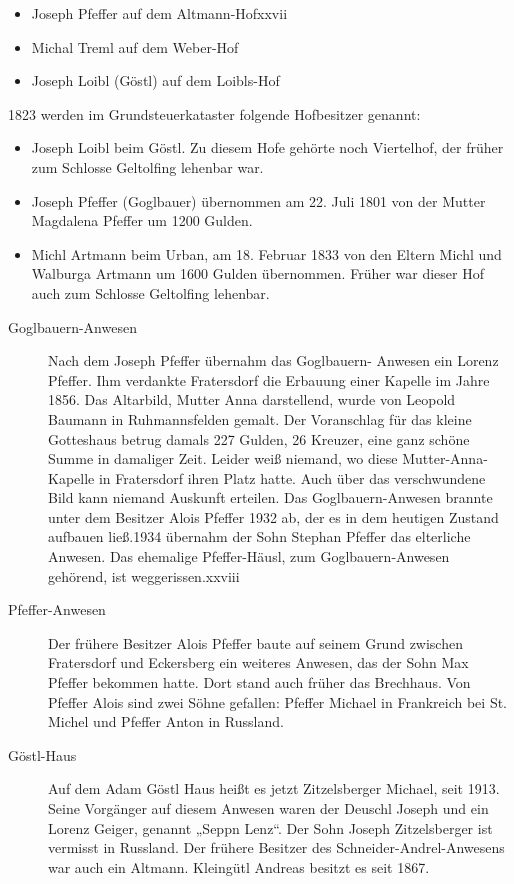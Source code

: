 \documentclass[12pt,a4pager,draft]{book}
\begin{document}
\begin{itemize}
\item Joseph Pfeffer auf dem Altmann-Hofxxvii

\item Michal Treml auf dem Weber-Hof

\item Joseph Loibl (Göstl) auf dem Loibls-Hof
\end{itemize}

1823 werden im Grundsteuerkataster folgende Hofbesitzer genannt:

\begin{itemize}
\item Joseph Loibl beim Göstl. Zu diesem Hofe gehörte noch Viertelhof, der
früher zum Schlosse Geltolfing lehenbar war.

\item Joseph Pfeffer (Goglbauer) übernommen am 22. Juli 1801 von der Mutter
Magdalena Pfeffer um 1200 Gulden.

\item Michl Artmann beim Urban, am 18. Februar 1833 von den Eltern Michl und
Walburga Artmann um 1600 Gulden übernommen. Früher war dieser Hof auch zum
Schlosse Geltolfing lehenbar.
\end{itemize}

\begin{description}
\item[Goglbauern-Anwesen] Nach dem Joseph Pfeffer übernahm das Goglbauern-
Anwesen ein Lorenz Pfeffer. Ihm verdankte Fratersdorf die Erbauung einer Kapelle
im Jahre
1856. Das Altarbild, Mutter Anna darstellend, wurde von Leopold Baumann in
Ruhmannsfelden gemalt. Der Voranschlag für das kleine Gotteshaus betrug damals
227 Gulden, 26 Kreuzer, eine ganz schöne Summe in damaliger Zeit. Leider weiß
niemand, wo diese Mutter-Anna-Kapelle in Fratersdorf ihren Platz hatte. Auch
über das verschwundene Bild kann niemand Auskunft erteilen. Das
Goglbauern-Anwesen brannte unter dem Besitzer Alois Pfeffer 1932 ab, der es in
dem heutigen Zustand aufbauen ließ.1934 übernahm der Sohn Stephan Pfeffer das
elterliche Anwesen. Das ehemalige Pfeffer-Häusl, zum Goglbauern-Anwesen
gehörend, ist weggerissen.xxviii

\item[Pfeffer-Anwesen] Der frühere Besitzer Alois Pfeffer baute auf seinem
Grund zwischen Fratersdorf und Eckersberg ein weiteres Anwesen, das der Sohn Max
Pfeffer bekommen hatte. Dort stand auch früher das Brechhaus. Von Pfeffer Alois
sind zwei Söhne gefallen: Pfeffer Michael in Frankreich bei St. Michel und
Pfeffer Anton in Russland.

\item[Göstl-Haus] Auf dem Adam Göstl Haus heißt es jetzt Zitzelsberger Michael,
seit
1913. Seine Vorgänger auf diesem Anwesen waren der Deuschl Joseph und ein Lorenz
Geiger, genannt „Seppn Lenz“. Der Sohn Joseph Zitzelsberger ist vermisst in
Russland. Der frühere Besitzer des Schneider-Andrel-Anwesens war auch ein
Altmann. Kleingütl Andreas besitzt es seit 1867.
\end{description}
\end{document}
